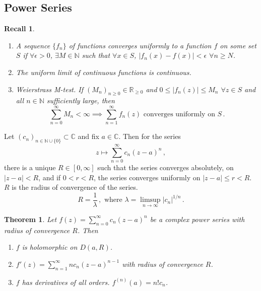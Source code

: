 \documentclass{article}
\theoremstyle{plain}\theoremheaderfont{\normalfont\itshape}\theorembodyfont{\rmfamily}\theoremseparator{.}\newtheorem*{rem}{Remark}\newtheorem*{ex}{Example}\newtheorem*{proof}{Proof}\newtheorem*{altp}{Alternative proof}\newtheorem*{con}{Consequences}\newtheorem*{notn}{Notations}\newtheorem*{cau}{Caution}\newtheorem*{term}{Terminology}\newtheorem*{keyex}{Key example}
\theoremstyle{plain}\theoremheaderfont{\normalfont\bfseries}\theorembodyfont{\rmfamily}\theoremseparator{.}\newtheorem{thm}{Theorem}[section]\newtheorem{lem}[thm]{Lemma}\newtheorem{prop}[thm]{Proposition}\newtheorem*{cor}{Corollary}\newtheorem{defn}[thm]{Definition}\newtheorem{clm}[thm]{Claim}\newtheorem{clminproof}{Claim}\newtheorem{leminproof}{Lemma}\newtheorem{app}{Application}
\theoremstyle{break}\theoremheaderfont{\normalfont\itshape}\theorembodyfont{\rmfamily}\theoremseparator{.\medskip}\newtheorem*{proofskip}{Proof}\newtheorem*{exs}{Examples}\newtheorem*{rems}{Remarks}\newtheorem*{rec}{Recall}\newtheorem*{ppts}{Properties}
\theoremstyle{break}\theoremheaderfont{\normalfont\bfseries}\theorembodyfont{\rmfamily}\theoremseparator{.\medskip}\newtheorem{lemskip}[thm]{Lemma}\newtheorem{defnskip}[thm]{Definition}\newtheorem{propskip}[thm]{Proposition}\newtheorem{thmskip}[thm]{Theorem}
\numberwithin{equation}{section}
\newcommand{\abs}[1]{\left|#1\right|}
\newcommand{\NN}{\mathbb{N}}
\newcommand{\RR}{\mathbb{R}}
\newcommand{\CC}{\mathbb{C}}
\begin{document}
    \subsection{Power Series}
    \begin{rec}
        \begin{enumerate}[topsep=0pt,label=(\roman*)]
            \item A sequence \(\{f_n\}\) of functions converges uniformly to a function \(f\) on some set \(S\) if \(\forall\epsilon>0\), \(\exists M\in\NN\) such that \(\forall x\in S\), \(\abs{f_n(x)-f(x)}<\epsilon\) \(\forall n\ge N\).
            \item The uniform limit of continuous functions is continuous.
            \item Weierstrass M-test. If \((M_n)_{n\ge 0}\in \RR_{\ge 0}\) and \(0\le\abs{f_n(z)}\le M_n\) \(\forall z\in S\) and all \(n\in\NN\) sufficiently large, then
            \[\sum_{n=0}^{\infty}M_n<\infty\implies\sum_{n=1}^{\infty}f_n(z)\text{ converges uniformly on }S\,.\]
        \end{enumerate}
    \end{rec}
    Let \((c_n)_{n\in\NN\cup\{0\}}\subset\CC\) and fix \(a\in\CC\). Then for the series
    \[z\mapsto\sum_{n=0}^{\infty}c_n(z-a)^n\,,\]
    there is a unique \(R\in[0,\infty]\) such that the series converges absolutely, on \(\abs{z-a}<R\), and if \(0<r<R\), the series converges uniformly on \(\abs{z-a}\le r<R\). \(R\) is the radius of convergence of the series.
    \[R=\frac{1}{\lambda}\,,\text{ where }\lambda=\limsup_{n\to\infty}\abs{c_n}^{1/n}\,.\]
    \begin{thm}
        Let \(f(z)=\sum_{n=0}^{\infty} c_n(z-a)^n\) be a complex power series with radius of convergence \(R\). Then
        \begin{enumerate}[topsep=0pt,label=(\roman*)]
            \item \(f\) is holomorphic on \(D(a,R)\).
            \item \(f'(z)=\sum_{n=1}^{\infty}nc_n(z-a)^{n-1}\) with radius of convergence \(R\).
            \item \(f\) has derivatives of all orders. \(f^{(n)}(a)=n!c_n\).
        \end{enumerate}
    \end{thm}
\end{document}
